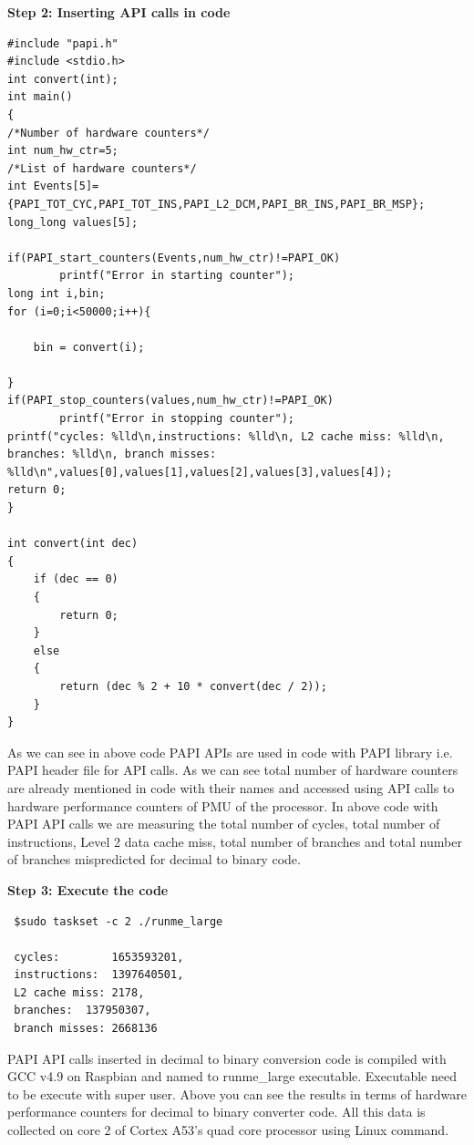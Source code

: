   \textbf{Step 2: Inserting API calls in code}
  
\begin{lstlisting}
#include "papi.h"
#include <stdio.h>
int convert(int);
int main()
{
/*Number of hardware counters*/
int num_hw_ctr=5;
/*List of hardware counters*/
int Events[5]={PAPI_TOT_CYC,PAPI_TOT_INS,PAPI_L2_DCM,PAPI_BR_INS,PAPI_BR_MSP};
long_long values[5];

if(PAPI_start_counters(Events,num_hw_ctr)!=PAPI_OK)
        printf("Error in starting counter");
long int i,bin;
for (i=0;i<50000;i++){

    bin = convert(i);

}
if(PAPI_stop_counters(values,num_hw_ctr)!=PAPI_OK)
        printf("Error in stopping counter");
printf("cycles: %lld\n,instructions: %lld\n, L2 cache miss: %lld\n, branches: %lld\n, branch misses: %lld\n",values[0],values[1],values[2],values[3],values[4]);
return 0;
}

int convert(int dec)
{
    if (dec == 0)
    {
        return 0;
    }
    else
    {
        return (dec % 2 + 10 * convert(dec / 2));
    }
}

\end{lstlisting}

\par As we can see in above code PAPI APIs are used in code with PAPI library i.e. PAPI header file for API calls. As we can see total number of hardware counters are already mentioned in code with their names and accessed using API calls to hardware performance counters of PMU of the processor. In above code with PAPI API calls we are measuring the total number of cycles, total number of instructions, Level 2 data cache miss, total number of branches and total number of branches mispredicted for decimal to binary code. 

  \textbf{Step 3: Execute the code}

\begin{lstlisting}
 $sudo taskset -c 2 ./runme_large
 
 cycles:		1653593201,
 instructions:	1397640501,
 L2 cache miss:	2178,
 branches:	137950307,
 branch misses:	2668136
\end{lstlisting}

\par PAPI API calls inserted in decimal to binary conversion code is compiled with GCC v4.9 on Raspbian and named to runme\_large executable. Executable need to be execute with super user. Above you can see the results in terms of hardware performance counters for decimal to binary converter code. All this data is collected on core 2 of Cortex A53's quad core processor using Linux command. 

